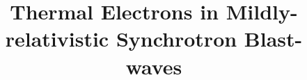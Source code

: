 \documentclass[twocolumn]{aastex63}
\begin{document}
\title{Thermal Electrons in Mildly-relativistic Synchrotron Blast-waves}


\end{document}
